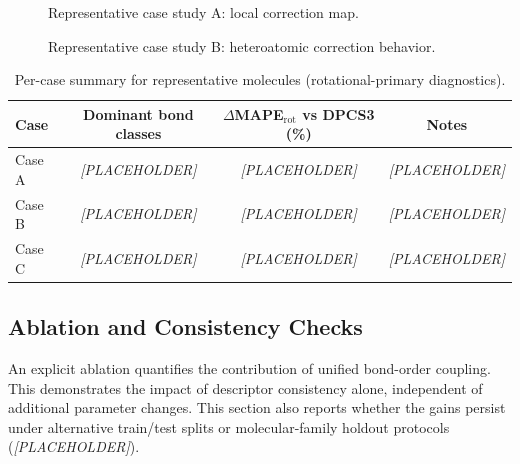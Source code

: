 \documentclass[journal=jctcce,manuscript=article]{achemso}
\begin{document}
\begin{figure}[ht]
\centering
{}
\caption{Representative case study A: local correction map.}
\label{fig:case_a}
\end{figure}

\begin{figure}[ht]
\centering
{}
\caption{Representative case study B: heteroatomic correction behavior.}
\label{fig:case_b}
\end{figure}

\begin{table}[ht]
\caption{Per-case summary for representative molecules (rotational-primary diagnostics).}
\label{tab:case_summary}
\centering
\begin{tabular}{lccc}
\toprule
Case & Dominant bond classes & $\Delta$MAPE$_\mathrm{rot}$ vs DPCS3 (\%) & Notes \\
\midrule
Case A & \textit{[PLACEHOLDER]} & \textit{[PLACEHOLDER]} & \textit{[PLACEHOLDER]} \\
Case B & \textit{[PLACEHOLDER]} & \textit{[PLACEHOLDER]} & \textit{[PLACEHOLDER]} \\
Case C & \textit{[PLACEHOLDER]} & \textit{[PLACEHOLDER]} & \textit{[PLACEHOLDER]} \\
\bottomrule
\end{tabular}
\end{table}

\subsection{Ablation and Consistency Checks}
An explicit ablation quantifies the contribution of unified bond-order coupling. This demonstrates the impact of descriptor consistency alone, independent of additional parameter changes.
This section also reports whether the gains persist under alternative train/test splits or molecular-family holdout protocols (\textit{[PLACEHOLDER]}).
\end{document}
